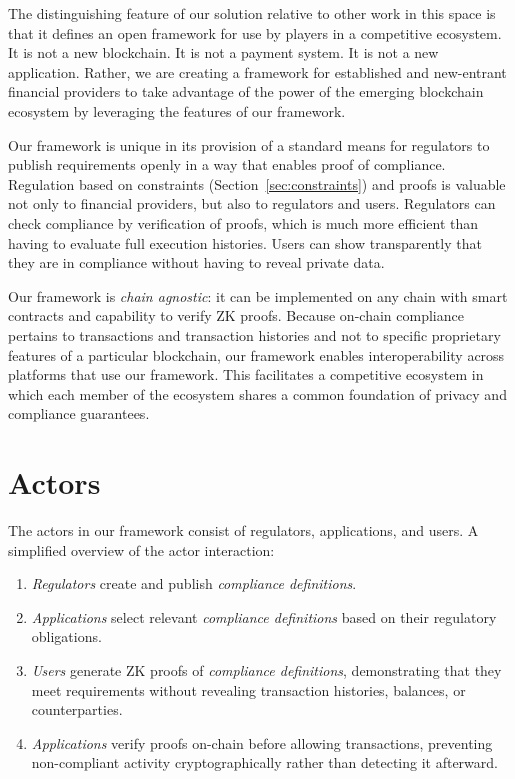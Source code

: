 \documentclass[9pt]{extreport}
\begin{document}
The distinguishing feature of our solution relative to other work in this space is that it defines an open framework for use by players in a competitive ecosystem.  It is not a new blockchain.  It is not a payment system.  It is not a new application.  Rather, we are creating a framework for established and new-entrant financial providers to take advantage of the power of the emerging blockchain ecosystem by leveraging the features of our framework.

Our framework is unique in its provision of a standard means for regulators to publish requirements openly in a way that enables proof of compliance.  Regulation based on constraints (Section~\ref{sec:constraints}) and proofs is valuable not only to financial providers, but also to regulators and users.  Regulators can check compliance by verification of proofs, which is much more efficient than having to evaluate full execution histories.  Users can show transparently that they are in compliance without having to reveal private data.

Our framework is \textit{chain agnostic}: it can be implemented on any chain with smart contracts and capability to verify ZK proofs.  Because on-chain compliance pertains to transactions and transaction histories and not to specific proprietary features of a particular blockchain, our framework enables interoperability across platforms that use our framework.  This facilitates a competitive ecosystem in which each member of the ecosystem shares a common foundation of privacy and compliance guarantees.

\section{Actors}
The actors in our framework consist of regulators, applications, and users.  A simplified overview of the actor interaction:

\begin{enumerate}
    \item \textit{Regulators} create and publish \textit{compliance definitions}.
    \item \textit{Applications} select relevant \textit{compliance definitions} based on their regulatory obligations.
    \item \textit{Users} generate ZK proofs of \textit{compliance definitions}, demonstrating that they meet requirements without revealing transaction histories, balances, or counterparties.
    \item \textit{Applications} verify proofs on-chain before allowing transactions, preventing non-compliant activity cryptographically rather than detecting it afterward.
\end{enumerate}
\end{document}
